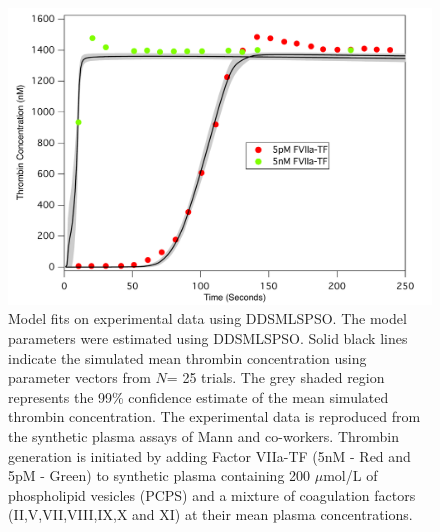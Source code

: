 \documentclass[12pt]{article}
\begin{document}
\begin{figure}[h]
\centering
\includegraphics[width=1.0\textwidth,height=0.5\textheight]{./figs/Figure_4_Sim_Train_E1_E5.pdf}
\caption{Model fits on experimental data using DDSMLSPSO. The model parameters were estimated using DDSMLSPSO. Solid black lines indicate the simulated mean thrombin concentration using parameter vectors from $N$= 25 trials. The grey shaded region represents the 99\% confidence estimate of the mean simulated thrombin concentration. The experimental data is reproduced from the synthetic plasma assays of Mann and co-workers. Thrombin generation is initiated by adding Factor VIIa-TF (5nM - Red and 5pM - Green) to synthetic plasma containing 200 $\mu$mol/L of phospholipid vesicles (PCPS) and a mixture of coagulation factors (II,V,VII,VIII,IX,X and XI) at their mean plasma concentrations.
}\label{fig-train}
\end{figure}

\clearpage
\end{document}
